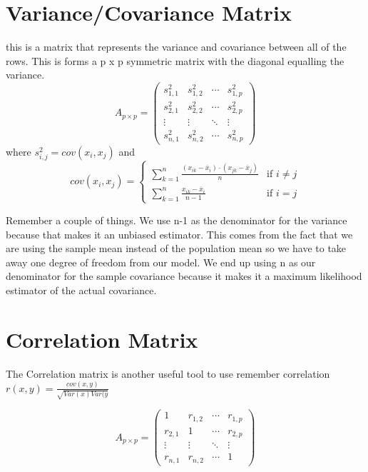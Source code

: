 \section{Variance/Covariance Matrix}
this is a matrix that represents the variance and covariance between all of the rows. This is forms a p x p symmetric matrix with the diagonal equalling the variance.
\begin{equation*}
    A_{p \times p} = 
    \begin{pmatrix}
    s^2_{1,1} & s^2_{1,2} & \cdots & s^2_{1,p} \\
    s^2_{2,1} & s^2_{2,2} & \cdots & s^2_{2,p} \\
    \vdots & \vdots & \ddots & \vdots \\
    s^2_{n,1} & s^2_{n,2} & \cdots & s^2_{n,p} 
    \end{pmatrix}
\end{equation*}
where
    $s^2_{i,j} = cov(x_i,x_j)$
and
\[
  cov(x_i,x_j) =
  \begin{cases}
    \sum_{k=1}^{n}{\frac{(x_{ik}-\overline{x}_i)\cdot(x_{jk}-\overline{x}_j)}{n}} & \text{if $i \neq j$} \\
    \sum_{k=1}^{n}\frac{x_{ik}-\overline{x}_i}{n-1} & \text{if $i=j$} 
  \end{cases}
\]

Remember a couple of things. We use n-1 as the denominator for the variance because that makes it an unbiased estimator. This comes from the fact that we are using the sample mean instead of the population mean so we have to take away one degree of freedom from our model. We end up using n as our denominator for the sample covariance because it makes it a maximum likelihood estimator of the actual covariance.

\section{Correlation Matrix}
The Correlation matrix is another useful tool to use
remember correlation $r(x,y) =\frac{cov(x,y)}{\sqrt{Var(x)Var(y}} $

\begin{equation*}
    A_{p \times p} = 
    \begin{pmatrix}
    1 & r_{1,2} & \cdots & r_{1,p} \\
    r_{2,1} & 1 & \cdots & r_{2,p} \\
    \vdots & \vdots & \ddots & \vdots \\
    r_{n,1} & r_{n,2} & \cdots & 1
    \end{pmatrix}
\end{equation*}


